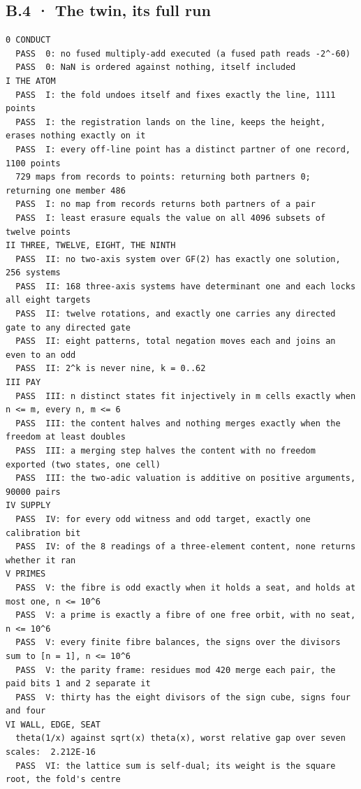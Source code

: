 \documentclass[10pt,twocolumn]{article}
\begin{document}
\hypertarget{b.4-the-twin-its-full-run}{%
\subsection{B.4 · The twin, its full
run}\label{b.4-the-twin-its-full-run}}

\begin{Verbatim}
0 CONDUCT
  PASS  0: no fused multiply-add executed (a fused path reads -2^-60)
  PASS  0: NaN is ordered against nothing, itself included
I THE ATOM
  PASS  I: the fold undoes itself and fixes exactly the line, 1111 points
  PASS  I: the registration lands on the line, keeps the height, erases nothing exactly on it
  PASS  I: every off-line point has a distinct partner of one record, 1100 points
  729 maps from records to points: returning both partners 0; returning one member 486
  PASS  I: no map from records returns both partners of a pair
  PASS  I: least erasure equals the value on all 4096 subsets of twelve points
II THREE, TWELVE, EIGHT, THE NINTH
  PASS  II: no two-axis system over GF(2) has exactly one solution, 256 systems
  PASS  II: 168 three-axis systems have determinant one and each locks all eight targets
  PASS  II: twelve rotations, and exactly one carries any directed gate to any directed gate
  PASS  II: eight patterns, total negation moves each and joins an even to an odd
  PASS  II: 2^k is never nine, k = 0..62
III PAY
  PASS  III: n distinct states fit injectively in m cells exactly when n <= m, every n, m <= 6
  PASS  III: the content halves and nothing merges exactly when the freedom at least doubles
  PASS  III: a merging step halves the content with no freedom exported (two states, one cell)
  PASS  III: the two-adic valuation is additive on positive arguments, 90000 pairs
IV SUPPLY
  PASS  IV: for every odd witness and odd target, exactly one calibration bit
  PASS  IV: of the 8 readings of a three-element content, none returns whether it ran
V PRIMES
  PASS  V: the fibre is odd exactly when it holds a seat, and holds at most one, n <= 10^6
  PASS  V: a prime is exactly a fibre of one free orbit, with no seat, n <= 10^6
  PASS  V: every finite fibre balances, the signs over the divisors sum to [n = 1], n <= 10^6
  PASS  V: the parity frame: residues mod 420 merge each pair, the paid bits 1 and 2 separate it
  PASS  V: thirty has the eight divisors of the sign cube, signs four and four
VI WALL, EDGE, SEAT
  theta(1/x) against sqrt(x) theta(x), worst relative gap over seven scales:  2.212E-16
  PASS  VI: the lattice sum is self-dual; its weight is the square root, the fold's centre

\end{Verbatim}
\end{document}
